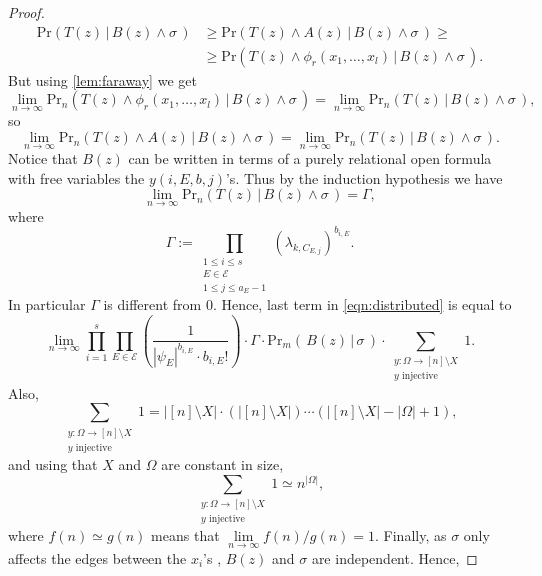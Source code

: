 \documentclass[11pt,notitlepage,a4paper]{article}
\theoremstyle{definition}
\newcommand{\Ln}{\lim\limits_{n\to \infty}}
\begin{document}
\begin{proof}
\begin{align*}
	\mathrm{Pr}( T(z)  \, | \, B(z) \wedge \sigma \, ) &
	\geq \mathrm{Pr}( T(z) \wedge A(z)  \, | \, B(z) \wedge \sigma \, ) \geq \\ 
	& \geq \mathrm{Pr}(T(z) \wedge \phi_r(x_1,\dots,x_l) 
	\, | \, B(z) \wedge \sigma \, ).
	\end{align*}
	But using \cref{lem:faraway} we get
	\[ \Ln  \mathrm{Pr}_n(T(z) \wedge \phi_r(x_1,\dots,x_l)
	\, | \, B(z) \wedge \sigma \, ) = 
	\Ln \mathrm{Pr}_n(T(z)\, | \, B(z) \wedge \sigma \, ), \]
	so
	\begin{equation} 
	\Ln  \mathrm{Pr}_n(T(z) \wedge A(z)
	\, | \, B(z) \wedge \sigma \, ) = 
	\Ln \mathrm{Pr}_n(T(z)\, | \, B(z) \wedge \sigma \, ). 
	\end{equation}
 	Notice that $B(z)$ can be written in terms of a purely relational
 	open formula with free variables the $y(i,E,b,j)$'s.
 	Thus by the induction hypothesis we have
 	\[\Ln \mathrm{Pr}_n( T(z)  \, | \, B(z) \wedge \sigma \, )= \Gamma, \]
 	where 
 	\begin{equation}\label{eqn:gammadef}
 	\Gamma:=\prod_{\substack{1\leq i \leq s \\ E\in \mathcal{E}\\
 	1\leq j \leq a_E - 1 }} (\lambda_{k,C_{E,j}})^{b_{i,E}}.
 	\end{equation}
 	In particular $\Gamma$ is different from $0$.
 	Hence, last term in \cref{eqn:distributed} is equal to
 	\begin{equation} \label{eqn:distributed2}
 	\Ln	\prod_{i=1}^{s}
 		\prod_{E\in \mathcal{E}} \left(\frac{1}{|\psi_E|^{b_{i,E}} \cdot b_{i,E}!}\right) 
 		\cdot \Gamma \cdot
 		\mathrm{Pr}_m(\, B(z) \, | \, \sigma \, )
 		\cdot \sum_{\substack{y:\Omega \rightarrow [n]\setminus X\\ y \text{ injective}}} 1.
 	\end{equation} 
 	Also,
 	\[\sum_{\substack{y:\Omega \rightarrow [n]\setminus X\\ y \text{ injective}}} 1 =|[n]\setminus X|\cdot (|[n]\setminus X|)\cdots 
 	(|[n]\setminus X|-|\Omega|+1), \]
 	and using that $X$ and $\Omega$ are constant in size,
 	\begin{equation}\label{eqn:sumones}
 	\sum_{\substack{y:\Omega \rightarrow [n]\setminus X\\ y \text{ injective}}} 1 \simeq n^{|\Omega|},
 	\end{equation}
 	where $f(n)\simeq g(n)$ means that $\Ln f(n)/g(n)=1$.
 	Finally, as $\sigma$ only affects the edges between the $x_i$'s
 	, $B(z)$ and $\sigma$ are independent. Hence,

\end{proof}
\end{document}
